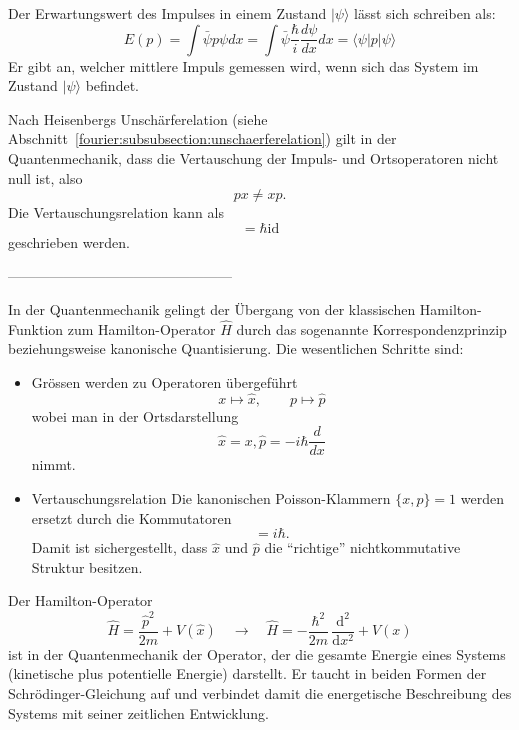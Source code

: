 	Der Erwartungswert des Impulses in einem Zustand $|\psi\rangle$ lässt sich schreiben als:
	\begin{equation}
		E(p) = \int \bar{\psi}p\psi dx
		= \int \bar{\psi} \frac{\hbar}{i} \frac{d\psi}{dx} dx
		= \langle \psi | p | \psi \rangle
	\end{equation}
	Er gibt an, welcher mittlere Impuls gemessen wird, wenn sich das System im Zustand $|\psi\rangle$ befindet.

	Nach Heisenbergs Unschärferelation (siehe Abschnitt~\ref{fourier:subsubsection:unschaerferelation}) gilt in der Quantenmechanik, dass die Vertauschung der Impuls- und Ortsoperatoren nicht null ist, also
	\begin{equation}
		px \neq xp.
	\end{equation}
	Die Vertauschungsrelation kann als
	\begin{equation}
		[x, p] = \hbar \text{id}
	\end{equation}
	geschrieben werden.



------------------------------------------------ %

In der Quantenmechanik gelingt der Übergang von der klassischen Hamilton-Funktion zum Hamilton-Operator $\hat H$ durch das sogenannte Korrespondenzprinzip beziehungsweise kanonische Quantisierung.
Die wesentlichen Schritte sind:
\begin{itemize}
\item Grössen werden zu Operatoren übergeführt %
\begin{equation}
	x \longmapsto \hat{x}, \qquad p \longmapsto \hat{p}
\end{equation}
wobei man in der Ortsdarstellung
\begin{equation}
	\hat{x} = x, \hat{p} = -i \hbar \frac{d}{dx}
\end{equation}
nimmt.
\item Vertauschungsrelation
Die kanonischen Poisson-Klammern $\{x, p\} = 1$ werden ersetzt durch die Kommutatoren
\begin{equation}
	[\hat{x}, \hat{p}] = i \hbar.
\end{equation}
Damit ist sichergestellt, dass $\hat{x}$ und $\hat{p}$ die ``richtige'' nichtkommutative Struktur besitzen.

\end{itemize}
Der Hamilton-Operator
\begin{equation}\label{fourier:equation:hamiltonOperator}
 	\hat{H} = \frac{\hat p^2}{2m} + V(\hat{x})
    \quad\longrightarrow\quad
    \hat{H} = -\frac{\hbar^2}{2m}\,\frac{\mathrm{d}^2}{\mathrm{d}x^2} + V(x)
\end{equation}
ist in der Quantenmechanik der Operator, der die gesamte Energie eines Systems (kinetische plus potentielle Energie) darstellt.
Er taucht in beiden Formen der Schrödinger-Gleichung auf und verbindet damit die energetische Beschreibung des Systems mit seiner zeitlichen Entwicklung.

